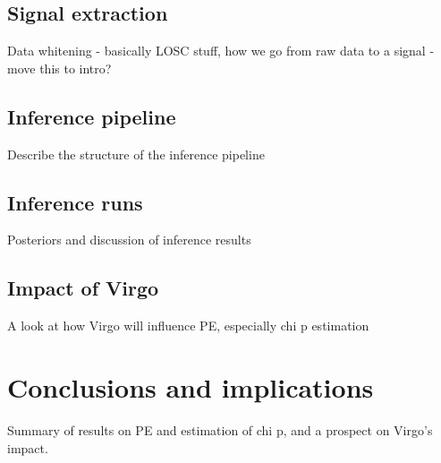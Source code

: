 \documentclass[]{article}
\begin{document}
\subsection{Signal extraction}
Data whitening - basically LOSC stuff, how we go from raw data to a signal - move this to intro?
\subsection{Inference pipeline}
Describe the structure of the inference pipeline
\subsection{Inference runs}
Posteriors and discussion of inference results
\subsection{Impact of Virgo}
A look at how Virgo will influence PE, especially chi p estimation
\section{Conclusions and implications}
Summary of results on PE and estimation of chi p, and a prospect on Virgo's impact.
\end{document}
